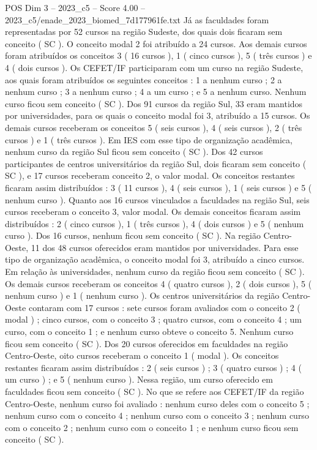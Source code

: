 \begin{textsample}{POS Dim 3 – 2023\_c5 – Score 4.00 – 2023\_c5/enade\_2023\_biomed\_7d177961fe.txt}
Já as faculdades foram representadas por 52 cursos na região Sudeste, dos quais dois ficaram sem conceito ( SC ).
O conceito modal 2 foi atribuído a 24 cursos.
Aos demais cursos foram atribuídos os conceitos 3 ( 16 cursos ), 1 ( cinco cursos ), 5 ( três cursos ) e 4 ( dois cursos ).
Os CEFET/IF participaram com um curso na região Sudeste, aos quais foram atribuídos os seguintes conceitos : 1 a nenhum curso ; 2 a nenhum curso ; 3 a nenhum curso ; 4 a um curso ; e 5 a nenhum curso.
Nenhum curso ficou sem conceito ( SC ).
Dos 91 cursos da região Sul, 33 eram mantidos por universidades, para os quais o conceito modal foi 3, atribuído a 15 cursos.
Os demais cursos receberam os conceitos 5 ( seis cursos ), 4 ( seis cursos ), 2 ( três cursos ) e 1 ( três cursos ).
Em IES com esse tipo de organização acadêmica, nenhum curso da região Sul ficou sem conceito ( SC ).
Dos 42 cursos participantes de centros universitários da região Sul, dois ficaram sem conceito ( SC ), e 17 cursos receberam conceito 2, o valor modal.
Os conceitos restantes ficaram assim distribuídos : 3 ( 11 cursos ), 4 ( seis cursos ), 1 ( seis cursos ) e 5 ( nenhum curso ).
Quanto aos 16 cursos vinculados a faculdades na região Sul, seis cursos receberam o conceito 3, valor modal.
Os demais conceitos ficaram assim distribuídos : 2 ( cinco cursos ), 1 ( três cursos ), 4 ( dois cursos ) e 5 ( nenhum curso ).
Dos 16 cursos, nenhum ficou sem conceito ( SC ).
Na região Centro-Oeste, 11 dos 48 cursos oferecidos eram mantidos por universidades.
Para esse tipo de organização acadêmica, o conceito modal foi 3, atribuído a cinco cursos.
Em relação às universidades, nenhum curso da região ficou sem conceito ( SC ).
Os demais cursos receberam os conceitos 4 ( quatro cursos ), 2 ( dois cursos ), 5 ( nenhum curso ) e 1 ( nenhum curso ).
Os centros universitários da região Centro-Oeste contaram com 17 cursos : sete cursos foram avaliados com o conceito 2 ( modal ) ; cinco cursos, com o conceito 3 ; quatro cursos, com o conceito 4 ; um curso, com o conceito 1 ; e nenhum curso obteve o conceito 5.
Nenhum curso ficou sem conceito ( SC ).
Dos 20 cursos oferecidos em faculdades na região Centro-Oeste, oito cursos receberam o conceito 1 ( modal ).
Os conceitos restantes ficaram assim distribuídos : 2 ( seis cursos ) ; 3 ( quatro cursos ) ; 4 ( um curso ) ; e 5 ( nenhum curso ).
Nessa região, um curso oferecido em faculdades ficou sem conceito ( SC ).
No que se refere aos CEFET/IF da região Centro-Oeste, nenhum curso foi avaliado : nenhum curso deles com o conceito 5 ; nenhum curso com o conceito 4 ; nenhum curso com o conceito 3 ; nenhum curso com o conceito 2 ; nenhum curso com o conceito 1 ; e nenhum curso ficou sem conceito ( SC ).

\end{textsample}
